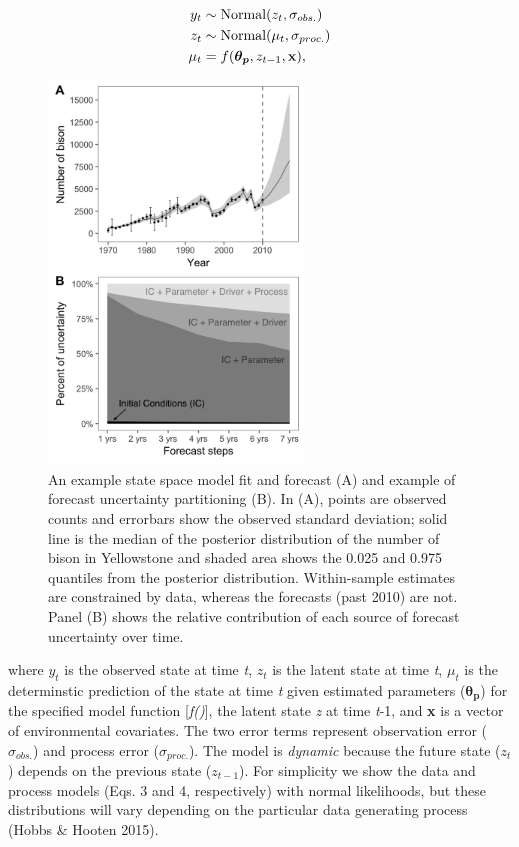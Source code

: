 \documentclass[12pt,]{article}
\begin{document}
\begin{align}
y_t &\sim \text{Normal}(z_t, \sigma_{obs.}) \\
z_t &\sim \text{Normal}(\mu_t, \sigma_{proc.}) \\
\mu_t &= f(\boldsymbol{\theta_p},z_{t-1},\bold{x}),
\end{align}\vspace{-2em}

\begin{figure}
  \centering
     \includegraphics[height=4in]{../figures/bison_combined.png}
  \caption{An example state space model fit and forecast (A) and example of forecast uncertainty partitioning (B). In (A), points are observed counts and errorbars show the observed standard deviation; solid line is the median of the posterior distribution of the number of bison in Yellowstone and shaded area shows the 0.025 and 0.975 quantiles from the posterior distribution. Within-sample estimates are constrained by data, whereas the forecasts (past 2010) are not. Panel (B) shows the relative contribution of each source of forecast uncertainty over time.}
\end{figure}

where \(y_t\) is the observed state at time \emph{t}, \(z_t\) is the
latent state at time \emph{t}, \(\mu_t\) is the determinstic prediction
of the state at time \emph{t} given estimated parameters
(\(\boldsymbol{\theta_p}\)) for the specified model function
{[}\emph{f()}{]}, the latent state \emph{z} at time \emph{t}-1, and
\textbf{x} is a vector of environmental covariates. The two error terms
represent observation error (\(\sigma_{obs.}\)) and process error
(\(\sigma_{proc.}\)). The model is \emph{dynamic} because the future
state (\(z_t\)) depends on the previous state (\(z_{t-1}\)). For
simplicity we show the data and process models (Eqs. 3 and 4,
respectively) with normal likelihoods, but these distributions will vary
depending on the particular data generating process (Hobbs \& Hooten
2015).
\end{document}
